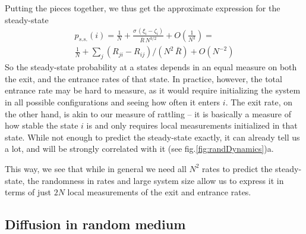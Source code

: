 \documentclass[reprint,prx]{revtex4-1}
\renewcommand{\=}[1]{\stackrel{#1}{=}} %
\renewcommand{\(}{\left (}
\renewcommand{\)}{\right  )}
\renewcommand{\[}{\left [}
\renewcommand{\]}{\right ]}
\newcommand{\<}{\left <}
\renewcommand{\>}{\right >}
\theoremstyle{definition}
\theoremstyle{remark}
\newcommand{\bigO}[1]{O\(#1\)}  %
\begin{document}
Putting the pieces together, we thus get the approximate expression for the steady-state 
\begin{align*}
p_{s.s.}(i)= \frac{1}{N} + \frac{\sigma\, (\xi_i-\zeta_i)}{\bar{R}\, N^{3/2}} + \bigO{\frac{1}{N^2}}=\\
\frac{1}{N} + \sum_j (R_{ji} - R_{ij})/(N^2\,\bar{R}) + \bigO{N^{-2}}
\end{align*}
So the steady-state probability at a states depends in an equal measure on both the exit, and the entrance rates of that state. In practice, however, the total entrance rate may be hard to measure, as it would require initializing the system in all possible configurations and seeing how often it enters $ i $. The exit rate, on the other hand, is akin to our measure of rattling -- it is basically a measure of how stable the state $ i $ is and only requires local measurements initialized in that state. While not enough to predict the steady-state exactly, it can already tell us a lot, and will be strongly correlated with it (see fig.\ref{fig:randDynamics})a.

This way, we see that while in general we need all $ N^2 $ rates to predict the steady-state, the randomness in rates and large system size allow us to express it in terms of just $ 2 N $ local measurements of the exit and entrance rates.

\subsection{Diffusion in random medium} \label{app:randDiff}
\end{document}
